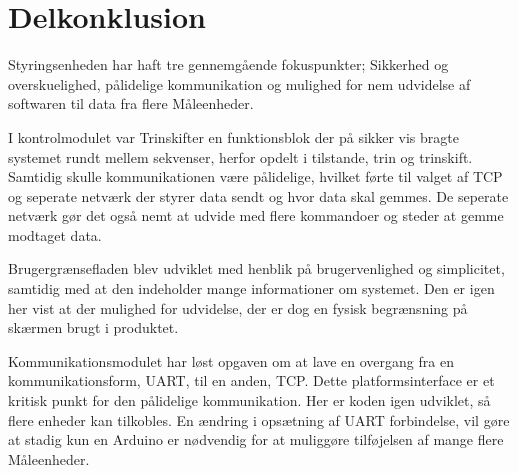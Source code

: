 
\section{Delkonklusion}

Styringsenheden har haft tre gennemgående fokuspunkter; Sikkerhed og overskuelighed, pålidelige kommunikation og mulighed for nem udvidelse af softwaren til data fra flere Måleenheder.


I kontrolmodulet var Trinskifter en funktionsblok der på sikker vis bragte systemet rundt mellem sekvenser, herfor opdelt i tilstande, trin og trinskift. Samtidig skulle kommunikationen være pålidelige, hvilket førte til valget af TCP og seperate netværk der styrer data sendt og hvor data skal gemmes. De seperate netværk gør det også nemt at udvide med flere kommandoer og steder at gemme modtaget data.


Brugergrænsefladen blev udviklet med henblik på brugervenlighed og simplicitet, samtidig med at den indeholder mange informationer om systemet. Den er igen her vist at der mulighed for udvidelse, der er dog en fysisk begrænsning på skærmen brugt i produktet.


Kommunikationsmodulet har løst opgaven om at lave en overgang fra en kommunikationsform, UART, til en anden, TCP. Dette platformsinterface er et kritisk punkt for den pålidelige kommunikation. Her er koden igen udviklet, så flere enheder kan tilkobles. En ændring i opsætning af UART forbindelse, vil gøre at stadig kun en Arduino er nødvendig for at muliggøre tilføjelsen af mange flere Måleenheder.
